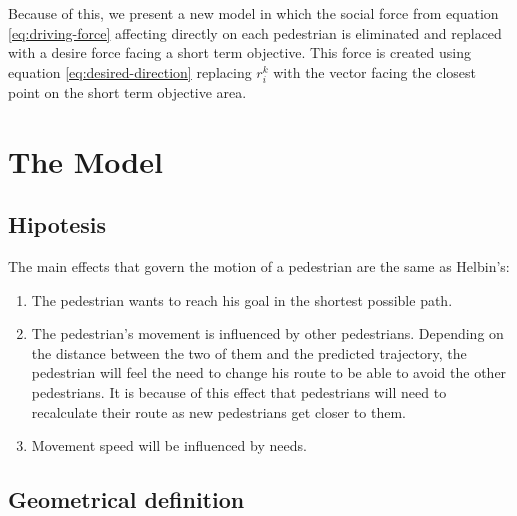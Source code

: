 \documentclass[english]{article}
\numberwithin{equation}{section}
\numberwithin{figure}{section}
\begin{document}
Because of this, we present a new model in which the social force from equation \ref{eq:driving-force} affecting directly on each pedestrian is eliminated and replaced with a desire force facing a short term objective. This force is created using equation \ref{eq:desired-direction} replacing $r_{i}^{k}$ with the vector facing the closest point on the short term objective area.

\section{The Model}


\subsection{Hipotesis}

The main effects that govern the motion of a pedestrian are the same
as Helbin's:
\begin{enumerate}
\item The pedestrian wants to reach his goal in the shortest possible path.
\item The pedestrian's movement is influenced by other pedestrians. Depending
on the distance between the two of them and the predicted trajectory,
the pedestrian will feel the need to change his route to be able to
avoid the other pedestrians. It is because of this effect that pedestrians
will need to recalculate their route as new pedestrians get closer
to them.
\item Movement speed will be influenced by needs.
\end{enumerate}

\subsection{Geometrical definition}
\end{document}
